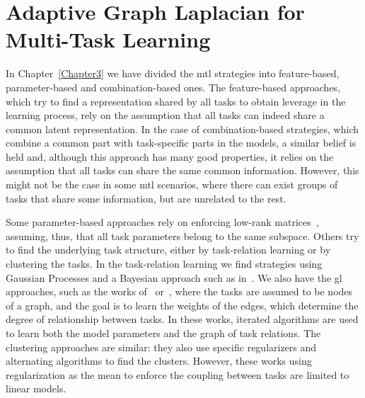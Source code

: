 
\chapter{Adaptive Graph Laplacian for Multi-Task Learning} %
\label{Chapter5}

{\bf \small{

    }}

In Chapter~\ref{Chapter3} we have divided the \acrfull{mtl} strategies into feature-based, parameter-based and combination-based ones.
The feature-based approaches, which try to find a representation shared by all tasks to obtain leverage in the learning process, rely on the assumption that all tasks can indeed share a common latent representation.
In the case of combination-based strategies, which combine a common part with task-specific parts in the models, a similar belief is held and, although this approach has many good properties, it relies on the assumption that all tasks can share the same common information.
However, this might not be the case in some \acrshort{mtl} scenarios, where there can exist groups of tasks that share some information, but are unrelated to the rest.

%
%
Some parameter-based approaches rely on enforcing low-rank matrices~\citep{AndoZ05,ChenTLY09,PongTJY10}, assuming, thus, that all task parameters belong to the same subspace.
Others try to find the underlying task structure, either by task-relation learning or by clustering the tasks. In the task-relation learning we find strategies using Gaussian Processes and a Bayesian approach such as in~\citet{BonillaCW07,ZhangY10}. We also have the \acrfull{gl} approaches, such as the works of~\citet{EvgeniouMP05} or~\citet{argyriou2013learning}, where the tasks are assumed to be nodes of a graph, and the goal is to learn the weights of the edges, which determine the degree of relationship between tasks.
In these works, iterated algorithms are used to learn both the model parameters and the graph of task relations.
The clustering approaches are similar: they also use specific regularizers and alternating algorithms to find the clusters.
However, these works using regularization as the mean to enforce the coupling between tasks are limited to linear models.

